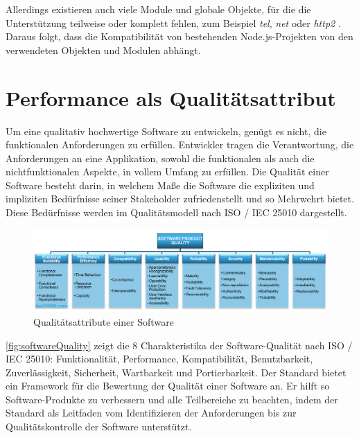 \noindent
Allerdings existieren auch viele Module und globale Objekte, für die die Unterstützung teilweise oder komplett fehlen, zum Beispiel \textit{tel}, \textit{net} oder \textit{http2} \cite{OvenSh.2023c}. Daraus folgt, dass die Kompatibilität von bestehenden Node.js-Projekten von den verwendeten Objekten und Modulen abhängt.

\section{Performance als Qualitätsattribut} \label{sec:foundations-Performance}
Um eine qualitativ hochwertige Software zu entwickeln, genügt es nicht, die funktionalen Anforderungen zu erfüllen. Entwickler tragen die Verantwortung, die Anforderungen an eine Applikation, sowohl die funktionalen als auch die nichtfunktionalen Aspekte, in vollem Umfang zu erfüllen. Die Qualität einer Software besteht darin, in welchem Maße die Software die expliziten und impliziten Bedürfnisse seiner Stakeholder zufriedenstellt und so Mehrwehrt bietet. Diese Bedürfnisse werden im Qualitätsmodell nach ISO / IEC 25010 dargestellt.\cite{.2022}\\

\begin{figure}[h]
	\centering
	\includegraphics[width=\linewidth]{./images/iso25010.png}
	\caption[Qualitätsattribute einer Software]{Qualitätsattribute einer Software \cite{.2022}}
	\label{fig:softwareQuality}
\end{figure}

\noindent
\autoref{fig:softwareQuality} zeigt die 8 Charakteristika der Software-Qualität nach ISO / IEC 25010: Funktionalität, Performance, Kompatibilität, Benutzbarkeit, Zuverlässigkeit, Sicherheit, Wartbarkeit und Portierbarkeit. Der Standard bietet ein Framework für die Bewertung der Qualität einer Software an. Er hilft so Software-Produkte zu verbessern und alle Teilbereiche zu beachten, indem der Standard als Leitfaden vom Identifizieren der Anforderungen bis zur Qualitätskontrolle der Software unterstützt.\cite{ISOIEC.}\\

